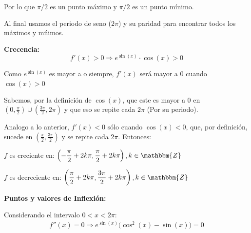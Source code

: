 \documentclass[12pt]{article}
\begin{document}
\begin{enumerate}[\hspace{9px} a)]
            Por lo que \(\pi/2\) es un punto m\'aximo y \(\pi/2\) es un punto m\'inimo.

            Al final usamos el periodo de seno (\(2\pi\)) y su paridad para encontrar todos los m\'aximos y m\'nimos.\medskip

        \textbf{Crecencia: }
            \begin{equation*}
                f'(x)>0 \Rightarrow e^{\sin(x)}\cdot\cos(x)>0
            \end{equation*}

            Como \(e^{\sin(x)}\) es mayor a o siempre, \(f'(x)\) ser\'a mayor a 0 cuando \(\cos(x)>0\)\medskip

            Sabemos, por la definici\'on de \(\cos(x)\), que este es mayor a 0 en \(\left(0,\displaystyle\frac{\pi}{2}\right)\cup\left(\frac{3\pi}{2},2\pi\right)\) y que eso se repite cada \(2\pi\) (Por su periodo).\medskip

            Analogo a lo anterior, \(f'(x)<0\) s\'olo cuando \(\cos(x)<0\), que, por definici\'on, sucede en \(\left(\displaystyle\frac{\pi}{2},\frac{3\pi}{2}\right)\) y se repite cada \(2\pi\). Entonces:\medskip

            $f$ es creciente en: \quad \(\left(-\displaystyle\frac{\pi}{2}+2k\pi,\frac{\pi}{2}+2k\pi\right), k\in\mathbbm{Z}\)\medskip

            $f$ es decreciente en: \quad \(\left(\displaystyle\frac{\pi}{2}+2k\pi,\frac{3\pi}{2}+2k\pi\right), k\in\mathbbm{Z}\)\medskip

        \textbf{Puntos y valores de Inflexi\'on: }\medskip

            Considerando el intervalo \(0<x<2\pi\):
            \begin{align*}
                f''(x)=0 \Longrightarrow e^{\sin(x)}\big(\cos^2(x)-\sin(x)\big)=0
            \end{align*}


\end{enumerate}
\end{document}
